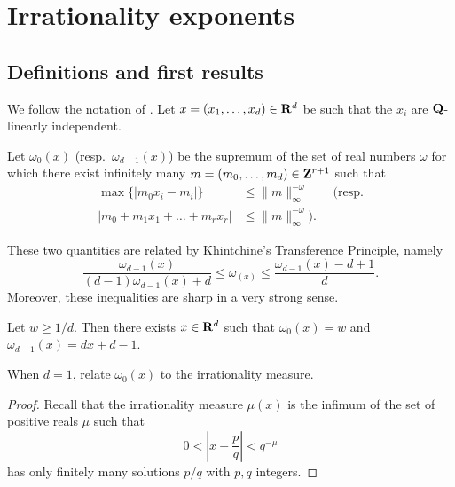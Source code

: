 
\chapter{Irrationality exponents}





\section{Definitions and first results}

We follow the notation of \cite{laurent-2009}. Let 
$x=(x_1,\dots,x_d)\in \mathbf{R}^d$ be such that the $x_i$ are $\mathbf{Q}$-linearly 
independent. 

\begin{definition}\label{def:approx-exp}
Let $\omega_0(x)$ (resp.~$\omega_{d-1}(x)$) be the supremum of the set of real 
numbers $\omega$ for which there exist infinitely many 
$m=(m_0,\dots,m_d)\in \mathbf{Z}^{r+1}$ such that 
\begin{align*}
	\max\{|m_0 x_i - m_i|\} 
		&\leqslant \|m\|_\infty^{-\omega}  \qquad\text{(resp.} \\
	|m_0 + m_1 x_1 + \dots + m_r x_r| 
		&\leqslant \|m\|_\infty^{-\omega} \text{).}
\end{align*}
\end{definition}

These two quantities are related by Khintchine's Transference Principle, namely 
\[
	\frac{\omega_{d-1}(x)}{(d-1) \omega_{d-1}(x)+d} \leqslant \omega_(x) \leqslant \frac{\omega_{d-1}(x)-d+1}{d} .
\]
Moreover, these inequalities are sharp in a very strong sense. 

\begin{theorem}[Jarn\'ik]
Let $w\geqslant 1/d$. Then there exists $x\in \mathbf{R}^d$ such that $\omega_0(x)=w$ 
and $\omega_{d-1}(x) = d x+d-1$. 
\end{theorem}

\begin{theorem}
When $d=1$, relate $\omega_0(x)$ to the irrationality measure. 
\end{theorem}
\begin{proof}
Recall that the irrationality measure $\mu(x)$ is the infimum of the set of 
positive reals $\mu$ such that 
\[
	0 < \left| x - \frac p q\right| < q^{-\mu} 
\]
has only finitely many solutions $p/q$ with $p,q$ integers. 
\end{proof}


